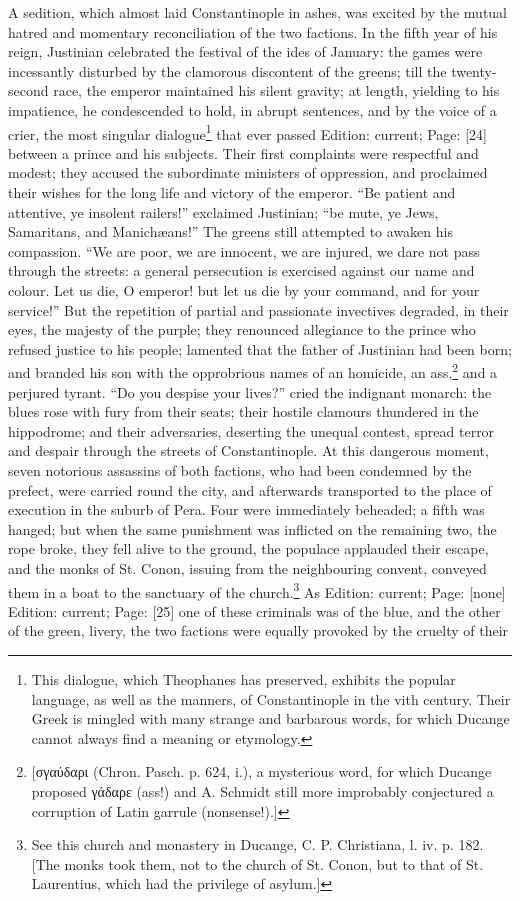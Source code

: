 A sedition, which almost laid Constantinople in ashes, was excited by the mutual hatred and momentary reconciliation of the two factions. In the fifth year of his reign, Justinian celebrated the festival of the ides of January: the games were incessantly disturbed by the clamorous discontent of the greens; till the twenty-second race, the emperor maintained his silent gravity; at length, yielding to his impatience, he condescended to hold, in abrupt sentences, and by the voice of a crier, the most singular dialogue\footnote{This dialogue, which Theophanes has preserved, exhibits the popular language, as well as the manners, of Constantinople in the vith century. Their Greek is mingled with many strange and barbarous words, for which Ducange cannot always find a meaning or etymology.} that ever passed Edition: current; Page: [24] between a prince and his subjects. Their first complaints were respectful and modest; they accused the subordinate ministers of oppression, and proclaimed their wishes for the long life and victory of the emperor. \texthebrew{“}Be patient and attentive, ye insolent railers!\texthebrew{}” exclaimed Justinian; \texthebrew{“}be mute, ye Jews, Samaritans, and Manichæans!\texthebrew{}” The greens still attempted to awaken his compassion. \texthebrew{“}We are poor, we are innocent, we are injured, we dare not pass through the streets: a general persecution is exercised against our name and colour. Let us die, O emperor! but let us die by your command, and for your service!\texthebrew{}” But the repetition of partial and passionate invectives degraded, in their eyes, the majesty of the purple; they renounced allegiance to the prince who refused justice to his people; lamented that the father of Justinian had been born; and branded his son with the opprobrious names of an homicide, an ass,\footnote{[\textgreek{σγαύδαρι} (Chron. Pasch. p. 624, i.), a mysterious word, for which Ducange proposed \textgreek{γάδαρε} (ass!) and A. Schmidt still more improbably conjectured a corruption of Latin garrule (nonsense!).]} and a perjured tyrant. \texthebrew{“}Do you despise your lives?\texthebrew{}” cried the indignant monarch: the blues rose with fury from their seats; their hostile clamours thundered in the hippodrome; and their adversaries, deserting the unequal contest, spread terror and despair through the streets of Constantinople. At this dangerous moment, seven notorious assassins of both factions, who had been condemned by the prefect, were carried round the city, and afterwards transported to the place of execution in the suburb of Pera. Four were immediately beheaded; a fifth was hanged; but when the same punishment was inflicted on the remaining two, the rope broke, they fell alive to the ground, the populace applauded their escape, and the monks of St. Conon, issuing from the neighbouring convent, conveyed them in a boat to the sanctuary of the church.\footnote{See this church and monastery in Ducange, C. P. Christiana, l. iv. p. 182. [The monks took them, not to the church of St. Conon, but to that of St. Laurentius, which had the privilege of asylum.]} As Edition: current; Page: [none] Edition: current; Page: [25] one of these criminals was of the blue, and the other of the green, livery, the two factions were equally provoked by the cruelty of their 